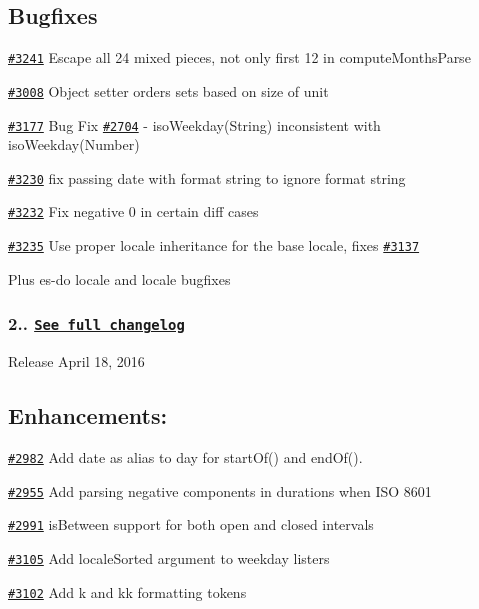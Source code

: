 \subsection*{Bugfixes}


\begin{DoxyItemize}
\item \href{https://github.com/moment/moment/pull/3241}{\tt \#3241} Escape all 24 mixed pieces, not only first 12 in compute\+Months\+Parse
\item \href{https://github.com/moment/moment/pull/3008}{\tt \#3008} Object setter orders sets based on size of unit
\item \href{https://github.com/moment/moment/pull/3177}{\tt \#3177} Bug Fix \href{https://github.com/moment/moment/pull/2704}{\tt \#2704} -\/ iso\+Weekday(\+String) inconsistent with iso\+Weekday(\+Number)
\item \href{https://github.com/moment/moment/pull/3230}{\tt \#3230} fix passing date with format string to ignore format string
\item \href{https://github.com/moment/moment/pull/3232}{\tt \#3232} Fix negative 0 in certain diff cases
\item \href{https://github.com/moment/moment/pull/3235}{\tt \#3235} Use proper locale inheritance for the base locale, fixes \href{https://github.com/moment/moment/pull/3137}{\tt \#3137}
\end{DoxyItemize}

Plus es-\/do locale and locale bugfixes

\subsubsection*{2.. \href{https://gist.github.com/ichernev/0132fcf5b61f7fc140b0bb0090480d49}{\tt See full changelog}}


\begin{DoxyItemize}
\item Release April 18, 2016
\end{DoxyItemize}

\subsection*{Enhancements\+:}


\begin{DoxyItemize}
\item \href{https://github.com/moment/moment/pull/2982}{\tt \#2982} Add \textquotesingle{}date\textquotesingle{} as alias to \textquotesingle{}day\textquotesingle{} for start\+Of() and end\+Of().
\item \href{https://github.com/moment/moment/pull/2955}{\tt \#2955} Add parsing negative components in durations when I\+SO 8601
\item \href{https://github.com/moment/moment/pull/2991}{\tt \#2991} is\+Between support for both open and closed intervals
\item \href{https://github.com/moment/moment/pull/3105}{\tt \#3105} Add locale\+Sorted argument to weekday listers
\item \href{https://github.com/moment/moment/pull/3102}{\tt \#3102} Add k and kk formatting tokens
\end{DoxyItemize}

